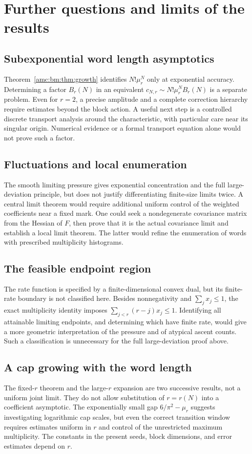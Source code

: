\documentclass[11pt,letterpaper]{article}
\theoremstyle{remark}\newtheorem{remark}[theorem]{Remark}
\begin{document}
\section{Further questions and limits of the results}\label{amc:bm:sec:questions}
\subsection{Subexponential word length asymptotics}
Theorem~\ref{amc:bm:thm:growth} identifies $N!\mu_r^N$ only at exponential accuracy. Determining a factor $B_r(N)$ in an equivalent $c_{N,r}\sim N!\mu_r^N B_r(N)$ is a separate problem. Even for $r=2$, a precise amplitude and a complete correction hierarchy require estimates beyond the block action. A useful next step is a controlled discrete transport analysis around the characteristic, with particular care near its singular origin. Numerical evidence or a formal transport equation alone would not prove such a factor.

\subsection{Fluctuations and local enumeration}
The smooth limiting pressure gives exponential concentration and the full large-deviation principle, but does not justify differentiating finite-size limits twice. A central limit theorem would require additional uniform control of the weighted coefficients near a fixed mark. One could seek a nondegenerate covariance matrix from the Hessian of $F$, then prove that it is the actual covariance limit and establish a local limit theorem. The latter would refine the enumeration of words with prescribed multiplicity histograms.

\subsection{The feasible endpoint region}
The rate function is specified by a finite-dimensional convex dual, but its finite-rate boundary is not classified here. Besides nonnegativity and $\sum_jx_j\le1$, the exact multiplicity identity imposes $\sum_{j<r}(r-j)x_j\le1$. Identifying all attainable limiting endpoints, and determining which have finite rate, would give a more geometric interpretation of the pressure and of atypical ascent counts. Such a classification is unnecessary for the full large-deviation proof above.

\subsection{A cap growing with the word length}
The fixed-$r$ theorem and the large-$r$ expansion are two successive results, not a uniform joint limit. They do not allow substitution of $r=r(N)$ into a coefficient asymptotic. The exponentially small gap $6/\pi^2-\mu_r$ suggests investigating logarithmic cap scales, but even the correct transition window requires estimates uniform in $r$ and control of the unrestricted maximum multiplicity. The constants in the present seeds, block dimensions, and error estimates depend on $r$.
\end{document}
